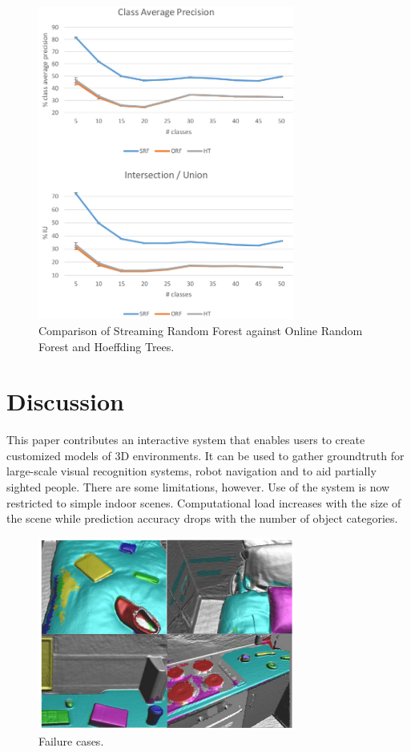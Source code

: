 \documentclass{llncs}
\begin{document}
\begin{figure}[!ht]
 \center
 \includegraphics[width=0.75\textwidth]{figures/srf_results}
 \caption{Comparison of Streaming Random Forest against Online Random Forest and Hoeffding Trees.}
 \label{fig:srf_results}
\end{figure}

\section{Discussion}

  This paper contributes an interactive system that enables users to create customized models of 3D environments. It can be used to gather groundtruth for large-scale visual recognition systems, robot navigation and to aid partially sighted people. There are some limitations, however. Use of the system is now restricted to simple indoor scenes. Computational load increases with the size of the scene while prediction accuracy drops with the number of object categories.
  
\begin{figure}[!ht]	 
 \center
 \includegraphics[width=0.75\textwidth]{figures/failures}
 \caption{Failure cases.}
 \label{fig:failures}
\end{figure}
  
\end{document}
